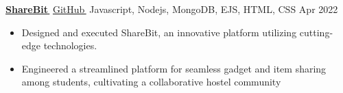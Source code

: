 \documentclass[letterpaper,11pt]{article}
\let\orighref\href
\renewcommand{\href}[2]{\orighref{#1}{#2\,\faExternalLink}}
\begin{document}
 \item{\href{https://github.com/shankar9834/ShareBit}{\textbf{ShareBit}} \ExternalLink \hspace{0.5em}\faGithub\hspace{0.2em}\href{https://github.com/shankar9834/ShareBit}{GitHub} \mid  \textup{Javascript, Nodejs, MongoDB, EJS, HTML, CSS}}  \hfill 
    {\textup{Apr 2022}}\\
    \vspace{-.3em}
    \begin{itemize}
        \item{
        Designed and executed ShareBit, an innovative platform utilizing cutting-edge technologies. 
        }
        \item{
        Engineered a streamlined platform for seamless gadget and item sharing among students, cultivating a collaborative hostel community
        }
        

    \end{itemize} 


\end{document}
